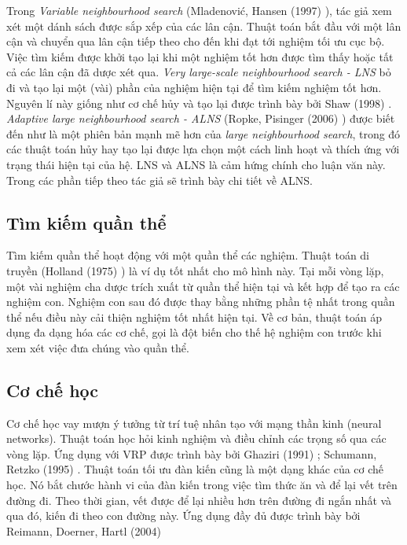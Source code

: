 Trong \textit{Variable neighbourhood search} (Mladenović, Hansen (1997) \cite{}), tác giả xem xét một dánh sách được sắp xếp của các lân cận. Thuật toán bắt đầu với một lân cận và chuyển qua lân cận tiếp theo cho đến khi đạt tới nghiệm tối ưu cục bộ. Việc tìm kiếm được khởi tạo lại khi một nghiệm tốt hơn được tìm thấy hoặc tất cả các lân cận đã dược xét qua. \textit{Very large-scale neighbourhood search - LNS} bỏ đi và tạo lại một (vài) phần của nghiệm hiện tại để tìm kiếm nghiệm tốt hơn. Nguyên lí này giống như cơ chế hủy và tạo lại được trình bày bởi Shaw (1998) \cite{shaw1998using}. \textit{Adaptive large neighbourhood search - ALNS} (Ropke, Pisinger (2006) \cite{ropke2006adaptive}) được biết đến như là một phiên bản mạnh mẽ hơn của \textit{large neighbourhood search}, trong đó các thuật toán hủy hay tạo lại được lựa chọn một cách linh hoạt và thích ứng với trạng thái hiện tại của hệ. LNS và ALNS là cảm hứng chính cho luận văn này. Trong các phần tiếp theo tác giả sẽ trình bày chi tiết về ALNS.

\subsection{Tìm kiếm quần thể}

Tìm kiếm quần thể hoạt động với một quần thể các nghiệm. Thuật toán di truyền (Holland (1975) \cite{holland1975adaptation}) là ví dụ tốt nhất cho mô hình này. Tại mỗi vòng lặp, một vài nghiệm cha dược trích xuất từ quần thể hiện tại và kết hợp để tạo ra các nghiệm con. Nghiệm con sau đó được thay bằng những phần tệ nhất trong quần thể nếu điều này cải thiện nghiệm tốt nhất hiện tại. Về cơ bản, thuật toán áp dụng đa dạng hóa các cơ chế, gọi là đột biến cho thế hệ nghiệm con trước khi xem xét việc đưa chúng vào quần thể.


\subsection{Cơ chế học}

Cơ chế học vay mượn ý tưởng từ trí tuệ nhân tạo với mạng thần kinh (neural networks). Thuật toán học hỏi kinh nghiệm và điều chỉnh các trọng số qua các vòng lặp. Ứng dụng với VRP được trình bày bởi Ghaziri (1991) \cite{ghaziri1991solving}; Schumann, Retzko (1995) \cite{schumann1995self}. Thuật toán tối ưu đàn kiến cũng là một dạng khác của cơ chế học. Nó bắt chước hành vi của đàn kiến trong việc tìm thức ăn và để lại vết trên đường đi. Theo thời gian, vết được để lại nhiều hơn trên đường đi ngắn nhất và qua đó, kiến đi theo con đường này. Ứng dụng đầy đủ được trình bày bởi Reimann, Doerner, Hartl (2004) \cite{reimann2004d}


